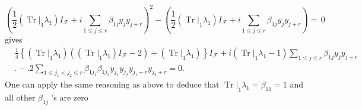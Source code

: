 \documentclass[aps, preprint]{revtex4}
\begin{document}
\begin{equation}\left (\frac{1}{2} \left (\left .\ensuremath{\operatorname*{Tr}}\right \vert _{1} \lambda _{1}\right ) I_{\mathcal{F}} +i \sum _{1 \leq j \leq r}\beta _{1 j} y_{j} y_{j +r}\right )^{2} -\left (\frac{1}{2} \left (\left .\ensuremath{\operatorname*{Tr}}\right \vert _{1} \lambda _{1}\right ) I_{\mathcal{F}} +i \sum _{1 \leq j \leq r}\beta _{1 j} y_{j} y_{j +r}\right ) =\,0
\end{equation}gives
\begin{align} & \frac{1}{4} \left \{\left (\left .\ensuremath{\operatorname*{Tr}}\right \vert _{1} \lambda _{1}\right ) \left (\left (\left .\ensuremath{\operatorname*{Tr}}\right \vert _{1} \lambda _{1}\right ) I_{\mathcal{F}} -2\right ) +\left (\left .\ensuremath{\operatorname*{Tr}}\right \vert _{1} \lambda _{1}\right )\right \} I_{\mathcal{F}} +i \left (\left .\ensuremath{\operatorname*{Tr}}\right \vert _{1} \lambda _{1} -1\right ) \sum _{1 \leq j \leq r}\beta _{1 j} y_{j} y_{j +r} \nonumber  \\
 & . -.2 \sum _{1 \leq j_{1} <j_{2} \leq r}\beta _{1 j_{1}} \beta _{1 j_{2}} y_{j_{1}} y_{j_{2}} y_{j_{1} +r} y_{j_{2} +r} =0.\end{align}One can apply the same reasoning as above to deduce that $\left .\ensuremath{\operatorname*{Tr}}\right \vert _{1} \lambda _{1} =\beta _{1 1} =1$ and all other $\beta _{1 j}$ 's are zero 
\end{document}
